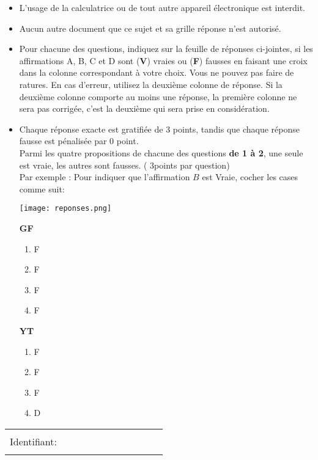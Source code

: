 \documentclass{book}%
\begin{document}
\begin{itemize}%
\item%
L'usage de la calculatrice ou de tout autre appareil électronique est interdit.%
\item%
Aucun autre document que ce sujet et sa grille réponse n'est autorisé.%
\item%
Pour chacune des questions, indiquez sur la feuille de réponses ci-jointes, si les affirmations A, B, C et D sont (\textbf{V}) vraies ou (\textbf{F}) fausses en faisant une croix dans la colonne correspondant à votre choix. Vous ne pouvez pas faire de ratures. En cas d'erreur, utilisez la deuxième colonne de réponse. Si la deuxième colonne comporte au moins une réponse, la première colonne ne sera pas corrigée, c'est la deuxième qui sera prise en considération.%
\item%
Chaque réponse exacte est gratifiée de 3 points, tandis que chaque réponse fausse est pénalisée par 0 point. \\ 	Parmi les quatre propositions de chacune des questions \textbf{de 1 à 2}, une seule est vraie, les autres sont fausses. ( 3points par question) \\ 	Par exemple : Pour indiquer que l'affirmation $B$ est Vraie, cocher les cases comme suit:  \\ \begin{center}	\texttt{[image: reponses.png]} \end{center}%
\begin{exercise}%
\textbf{GF }%
\begin{enumerate}[label=\textbf{\Alph*. }]%
\item%
F%
\item%
F%
\item%
F%
\item%
F%
\end{enumerate}%
\end{exercise}%
\begin{exercise}%
\textbf{YT }%
\begin{enumerate}[label=\textbf{\Alph*. }]%
\item%
F%
\item%
F%
\item%
F%
\item%
D%
\end{enumerate}%
\end{exercise}%
\end{itemize}%
\newpage%
\thispagestyle{empty}%
\begin{flushright}%
\begin{tabular}{|l|}%
\hline%
 \\%
Identifiant: $\qquad \qquad \qquad \qquad \qquad$ \\%
 \\%
\hline%
\end{tabular}%
\end{flushright}%
\end{document}
